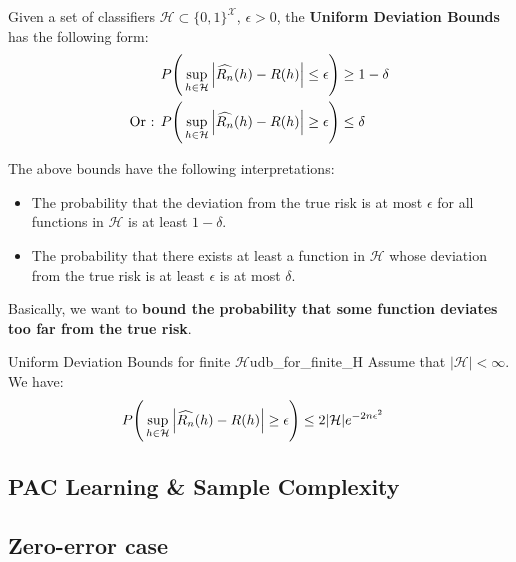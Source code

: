 \begin{definition}
    Given a set of classifiers $\mathcal{H} \subset \{0,1\}^{\mathcal{X}}$, $\epsilon > 0$, the \textbf{Uniform Deviation Bounds} has the following form:
    \begin{align*}
        P\Bigg( 
            \sup_{h\in\mathcal{H}}\Big| \widehat{R_n}(h) - R(h) \Big| \le \epsilon
         \Bigg) &\ge 1 - \delta \\
        \text{Or : }
        P\Bigg( 
            \sup_{h\in\mathcal{H}}\Big| \widehat{R_n}(h) - R(h) \Big| \ge \epsilon
         \Bigg) &\le \delta
    \end{align*}

    \noindent The above bounds have the following interpretations:
    \begin{itemize}
        \item The probability that the deviation from the true risk is at most $\epsilon$ for all functions in $\mathcal{H}$ is at least $1-\delta$.
        \item The probability that there exists at least a function in $\mathcal{H}$ whose deviation from the true risk is at least $\epsilon$ is at most $\delta$.
    \end{itemize}

    \noindent Basically, we want to \textbf{bound the probability that some function deviates too far from the true risk}.
\end{definition}

\begin{proposition}{Uniform Deviation Bounds for finite $\mathcal{H}$}{udb_for_finite_H}
    Assume that $|\mathcal{H}| < \infty$. We have:
    \begin{align*}
        P\Bigg( 
            \sup_{h\in\mathcal{H}}\Big| \widehat{R_n}(h) - R(h) \Big| \ge \epsilon
         \Bigg) &\le 2|\mathcal{H}|e^{-2n\epsilon^2}
    \end{align*}
\end{proposition}

\begin{proof*}
    
\end{proof*}


\subsection{PAC Learning \& Sample Complexity}

\subsection{Zero-error case}